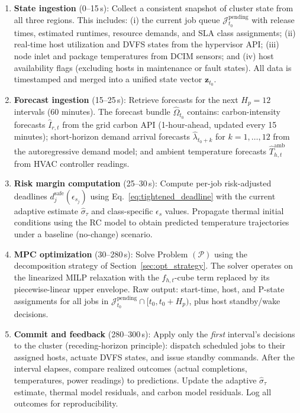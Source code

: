 \documentclass[a4paper,fleqn]{cas-dc}
\begin{document}
\begin{enumerate}
  \item \textbf{State ingestion} (0--15\,s): Collect a consistent snapshot of cluster state from all three regions. This includes: (i) the current job queue $\mathcal{J}^{\mathrm{pending}}_{t_0}$ with release times, estimated runtimes, resource demands, and SLA class assignments; (ii) real-time host utilization and DVFS states from the hypervisor API; (iii) node inlet and package temperatures from DCIM sensors; and (iv) host availability flags (excluding hosts in maintenance or fault states). All data is timestamped and merged into a unified state vector $\mathbf{z}_{t_0}$.

  \item \textbf{Forecast ingestion} (15--25\,s): Retrieve forecasts for the next $H_p = 12$ intervals (60 minutes). The forecast bundle $\hat{\Omega}_{t_0}$ contains: carbon-intensity forecasts $\hat{I}_{r,t}$ from the grid carbon API (1-hour-ahead, updated every 15 minutes); short-horizon demand arrival forecasts $\hat{\lambda}_{t_0+k}$ for $k=1,\ldots,12$ from the autoregressive demand model; and ambient temperature forecasts $\hat{T}^{\mathrm{amb}}_{h,t}$ from HVAC controller readings.

  \item \textbf{Risk margin computation} (25--30\,s): Compute per-job risk-adjusted deadlines $d^{\mathrm{safe}}_j(\epsilon_{s_j})$ using Eq.~\eqref{eq:tightened_deadline} with the current adaptive estimate $\hat{\sigma}_\tau$ and class-specific $\epsilon_s$ values. Propagate thermal initial conditions using the RC model to obtain predicted temperature trajectories under a baseline (no-change) scenario.

  \item \textbf{MPC optimization} (30--280\,s): Solve Problem $(\mathcal{P})$ using the decomposition strategy of Section~\ref{sec:opt_strategy}. The solver operates on the linearized MILP relaxation with the $f_{h,t}$-cube term replaced by its piecewise-linear upper envelope. Raw output: start-time, host, and P-state assignments for all jobs in $\mathcal{J}^{\mathrm{pending}}_{t_0} \cap [t_0, t_0+H_p)$, plus host standby/wake decisions.

  \item \textbf{Commit and feedback} (280--300\,s): Apply only the \emph{first} interval's decisions to the cluster (receding-horizon principle): dispatch scheduled jobs to their assigned hosts, actuate DVFS states, and issue standby commands. After the interval elapses, compare realized outcomes (actual completions, temperatures, power readings) to predictions. Update the adaptive $\hat{\sigma}_\tau$ estimate, thermal model residuals, and carbon model residuals. Log all outcomes for reproducibility.
\end{enumerate}
\end{document}
